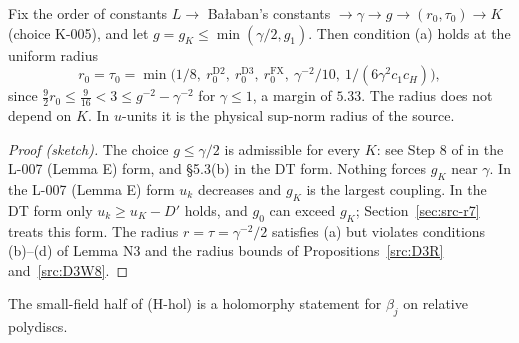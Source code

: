 \begin{proposition}\label{src:N3A}
Fix the order of constants $L\to$ Ba{\l}aban's constants $\to\gamma\to g\to(r_0,\tau_0)\to K$ (choice K-005), and let $g=g_K\le\min(\gamma/2,g_1)$. Then condition (a) holds at the uniform radius
\[r_0=\tau_0=\min\bigl(1/8,\ r_0^{\mathrm{D2}},\ r_0^{\mathrm{D3}},\ r_0^{\mathrm{FX}},\ \gamma^{-2}/10,\ 1/(6\gamma^2c_1c_H)\bigr),\]
since $\tfrac92r_0\le\tfrac9{16}<3\le g^{-2}-\gamma^{-2}$ for $\gamma\le1$, a margin of $5.33$. The radius does not depend on $K$. In $u$-units it is the physical sup-norm radius of the source.
\end{proposition}
\begin{proof}[Proof (sketch)]
The choice $g\le\gamma/2$ is admissible for every $K$: see Step 8 of  in the L-007 (Lemma E) form, and  \S5.3(b) in the DT form. Nothing forces $g_K$ near $\gamma$. In the L-007 (Lemma E) form $u_k$ decreases and $g_K$ is the largest coupling. In the DT form only $u_k\ge u_K-D'$ holds, and $g_0$ can exceed $g_K$; Section~\ref{sec:src-r7} treats this form. The radius $r=\tau=\gamma^{-2}/2$ satisfies (a) but violates conditions (b)--(d) of Lemma N3 and the radius bounds of Propositions~\ref{src:D3R} and~\ref{src:D3W8}.
\end{proof}

The small-field half of (H-hol) is a holomorphy statement for $\beta_j$ on relative polydiscs.

